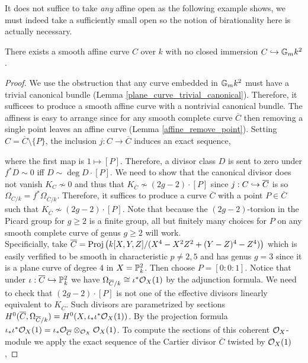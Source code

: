 \documentclass[12pt]{article}
\begin{document}
It does not suffice to take \textit{any} affine open as the following example shows, we must indeed take a sufficiently small open so the notion of birationality here is actually necessary.

\begin{prop}
There exists a smooth affine curve $C$ over $k$ with no closed immersion $C \embed \Gm{k}^2$. 
\end{prop}

\begin{proof}
We use the obstruction that any curve embedded in $\Gm{k}^2$ must have a trivial canonical bundle (Lemma \ref{plane_curve_trivial_canonical}). Therefore, it sufficees to produce a smooth affine curve with a nontrivial canonical bundle. The affiness is easy to arrange since for any smooth complete curve $\overline{C}$ then removing a single point leaves an affine curve (Lemma \ref{affine_remove_point}). Setting $C = \overline{C} \setminus \{ P \}$, the inclusion $j : C \to \overline{C}$ induces an exact sequence,
\begin{center}
\end{center}
where the first map is $1 \mapsto [P]$. Therefore, a divisor class $D$ is sent to zero under $f^* D \sim 0$ iff $D \sim \deg{D} \cdot [P]$. We need to show that the canonical divisor does not vanish $K_C \not \sim 0$ and thus that $K_{\overline{C}} \not\sim (2g - 2) \cdot [P]$ since $j : C \embed \overline{C}$ is \etale so $\Omega_{C/k} = f^* \Omega_{\overline{C}/k}$. Therefore, it suffices to produce a curve $\overline{C}$ with a point $P \in \overline{C}$ such that $K_{\overline{C}} \not\sim (2g - 2) \cdot [P]$. Note that because the $(2g - 2)$-torsion in the Picard group for $g \ge 2$ is a finite group, all but finitely many choices for $P$ on any smooth complete curve of genus $g \ge 2$ will work.
\bigskip\\
Specificially, take $\overline{C} = \Proj{k[X, Y, Z]/(X^4 - X^2 Z^2 + (Y - Z)^4 - Z^4)}$ which is easily verfified to be smooth in characteristic $p \neq 2,5$ and has genus $g = 3$ since it is a plane curve of degree $4$ in $X = \P^2_k$. Then choose $P = [0 : 0 : 1]$. Notice that under $\iota : \overline{C} \embed \P^2_k$ we have $\Omega_{\overline{C}/k} \cong \iota^* \struct{X}(1)$ by the adjunction formula. We need to check that $(2g - 2) \cdot [P]$ is not one of the effective divisors linearly equivalent to $K_{\overline{C}}$. Such divisors are parametrized by sections $H^0(\overline{C}, \Omega_{\overline{C}/k}) = H^0(X, \iota_* \iota^* \struct{X}(1))$. By the projection formula $\iota_* \iota^* \struct{X}(1) = \iota_* \struct{\overline{C}} \otimes_{\struct{X}} \struct{X}(1)$. To compute the sections of this coherent $\struct{X}$-module we apply the exact sequence of the Cartier divisor $\overline{C}$ twisted by $\struct{X}(1)$,

\end{proof}
\end{document}
